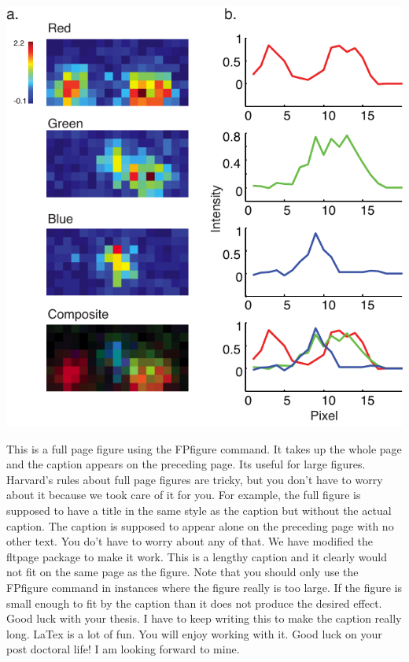 \begin{FPfigure} \includegraphics[width=\textwidth]{figures/fullpage}
\caption[Short figure name.]{This is a full page figure using the FPfigure
command. It takes up the whole page and the caption appears on the preceding
page. Its useful for large figures. Harvard's rules about full page figures
are tricky, but you don't have to worry about it because we took care of it
for you. For example, the full figure is supposed to have a title in the same
style as the caption but without the actual caption. The caption is supposed
to appear alone on the preceding page with no other text. You do't have to
worry about any of that. We have modified the fltpage package to make it
work. This is a lengthy caption and it clearly would not fit on the same page
as the figure. Note that you should only use the FPfigure command in
instances where the figure really is too large. If the figure is small enough
to fit by the caption than it does not produce the desired effect. Good luck
with your thesis. I have to keep writing this to make the caption really
long. LaTex is a lot of fun. You will enjoy working with it. Good luck on
your post doctoral life! I am looking forward to mine.
\label{fig:myFullPageFigure}} \end{FPfigure} \afterpage{\clearpage}

